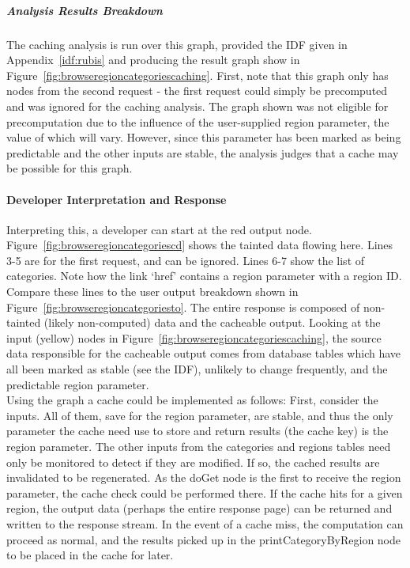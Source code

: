 \documentclass[msc,oneside]{ubcthesis}
\begin{document}
\subparagraph{Analysis Results Breakdown}
The caching analysis is run over this graph, provided the IDF given in Appendix~\ref{idf:rubis} and producing the result graph show in Figure~\ref{fig:browseregioncategoriescaching}. First, note that this graph only has nodes from the second request - the first request could simply be precomputed and was ignored for the caching analysis. The graph shown was not eligible for precomputation due to the influence of the user-supplied region parameter, the value of which will vary. However, since this parameter has been marked as being predictable and the other inputs are stable, the analysis judges that a cache may be possible for this graph. 

\paragraph{Developer Interpretation and Response}
Interpreting this, a developer can start at the red output node. Figure~\ref{fig:browseregioncategoriescd} shows the tainted data flowing here. Lines 3-5 are for the first request, and can be ignored. Lines 6-7 show the list of categories. Note how the link `href' contains a region parameter with a region ID. Compare these lines to the user output breakdown shown in Figure~\ref{fig:browseregioncategoriesto}. The entire response is composed of non-tainted (likely non-computed) data and the cacheable output. Looking at the input (yellow) nodes in Figure~\ref{fig:browseregioncategoriescaching}, the source data responsible for the cacheable output comes from database tables which have all been marked as stable (see the IDF), unlikely to change frequently, and the predictable region parameter. \\

Using the graph a cache could be implemented as follows: First, consider the inputs. All of them, save for the region parameter, are stable, and thus the only parameter the cache need use to store and return results (the cache key) is the region parameter. The other inputs from the categories and regions tables need only be monitored to detect if they are modified. If so, the cached results are invalidated to be regenerated. As the doGet node is the first to receive the region parameter, the cache check could be performed there. If the cache hits for a given region, the output data (perhaps the entire response page) can be returned and written to the response stream. In the event of a cache miss, the computation can proceed as normal, and the results picked up in the printCategoryByRegion node to be placed in the cache for later.
\end{document}
